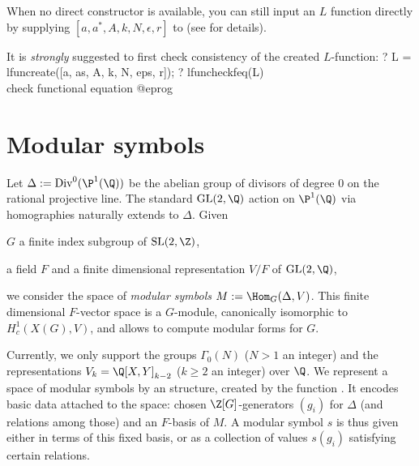 When no direct constructor is available, you can still input an $L$ function
directly by supplying $[a, a^*,A, k, N, \epsilon, r]$ to 
(see  for details).

It is \emph{strongly} suggested to first check consistency of the created
$L$-function:
\bprog
? L = lfuncreate([a, as, A, k, N, eps, r]);
? lfuncheckfeq(L)  \\ check functional equation
@eprog


%
%

\section{Modular symbols}

Let $\Delta := \text{Div}^0(\P^1(\Q))$ be the abelian group of divisors of
degree $0$ on the rational projective line. The standard $\text{GL}(2,\Q)$
action on $\P^1(\Q)$ via homographies naturally extends to $\Delta$. Given

\item $G$ a finite index subgroup of $\text{SL}(2,\Z)$,

\item a field $F$ and a finite dimensional representation $V/F$ of
  $\text{GL}(2,\Q)$,

\noindent we consider the space of \emph{modular symbols} $M :=
\Hom_G(\Delta, V)$. This finite dimensional $F$-vector
space is a $G$-module, canonically isomorphic to $H^1_c(X(G), V)$,
and allows to compute modular forms for $G$.

Currently, we only support the groups $\Gamma_0(N)$ ($N > 1$ an integer)
and the representations $V_k = \Q[X,Y]_{k-2}$ ($k \geq 2$ an integer) over
$\Q$. We represent a space of modular symbols by an  structure,
created by the function . It encodes basic data attached to the
space: chosen $\Z[G]$-generators $(g_i)$ for $\Delta$ (and relations among
those) and an $F$-basis of $M$. A modular symbol $s$ is thus given either in
terms of this fixed basis, or as a collection of values $s(g_i)$
satisfying certain relations.

